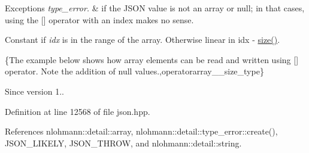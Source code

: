 \begin{DoxyExceptions}{Exceptions}
{\em type\+\_\+error.} & if the J\+S\+ON value is not an array or null; in that cases, using the \mbox{[}\mbox{]} operator with an index makes no sense.\\
\hline
\end{DoxyExceptions}
Constant if {\itshape idx} is in the range of the array. Otherwise linear in {\ttfamily idx -\/ \hyperlink{classnlohmann_1_1basic__json_a25e27ad0c6d53c01871c5485e1f75b96}{size()}}.

\{The example below shows how array elements can be read and written using {\ttfamily \mbox{[}\mbox{]}} operator. Note the addition of {\ttfamily null} values.,operatorarray\+\_\+\+\_\+size\+\_\+type\}

\begin{DoxySince}{Since}
version 1.. 
\end{DoxySince}


Definition at line 12568 of file json.\+hpp.



References nlohmann\+::detail\+::array, nlohmann\+::detail\+::type\+\_\+error\+::create(), J\+S\+O\+N\+\_\+\+L\+I\+K\+E\+LY, J\+S\+O\+N\+\_\+\+T\+H\+R\+OW, and nlohmann\+::detail\+::string.


